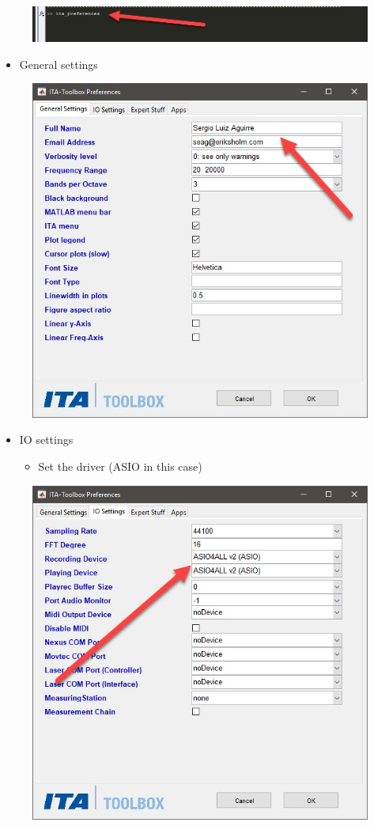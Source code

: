 \documentclass[12pt, a4paper, twoside, onecolumn]{article}%
\begin{document}
\begin{figure}[H]\centering
\includegraphics[width=.7\textwidth]{Figures/f3.jpg}
\end{figure}
\pagebreak

\begin{itemize}
    \item General settings
\end{itemize}
\begin{figure}[H] \centering
\includegraphics[width=.5\textwidth]{Figures/f4.jpg}
\end{figure}

\begin{itemize}
    \item IO settings
    \begin{itemize}
        \item  Set the driver (ASIO in this case)
    \end{itemize}
\end{itemize}

\begin{figure}[H] \centering
\includegraphics[width=.5\textwidth]{Figures/f5.jpg}
\end{figure}
\vfill
\end{document}
